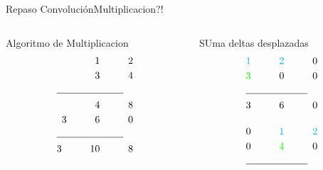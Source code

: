 \begin{frame}{Repaso Convolución}{Multiplicacion?!}
   \begin{columns}[t]
      \hspace{5pt}
   \begin{column}{.3\textwidth}
      \tiny
      Algoritmo de Multiplicacion
          \begin{align*}
               1\hspace{1cm} 2\\
               3\hspace{1cm} 4 \\
               \cline{1-2}
               4 \hspace{1cm} 8 \\
               3 \hspace{1cm} 6 \hspace{1cm}0 \\
               \cline{1-2}
               3 \hspace{1cm} 10 \hspace{1cm} 8\\
            \end{align*}
      \end{column}
      \hspace{2pt}
      \vrule
      \hspace{2pt}
      \begin{column}{.3\textwidth}
      \tiny
      SUma deltas desplazadas
            \begin{align*}
               \textcolor{cyan} {1} \hspace{1cm}\textcolor{cyan}{2} \hspace{1cm}0\\
               \textcolor{green}{3} \hspace{1cm}                 0  \hspace{1cm}0\\
               \cline{1-2}
               3\hspace{1cm} 6 \hspace{1cm}0\\[0.4cm]
               0\hspace{1cm}\textcolor{cyan} {1} \hspace{1cm}\textcolor{cyan}{2}\\
               0\hspace{1cm}\textcolor{green}{4} \hspace{1cm}                 0\\
               \cline{1-2}

\end{align*}
\end{column}
\end{columns}
\end{frame}
